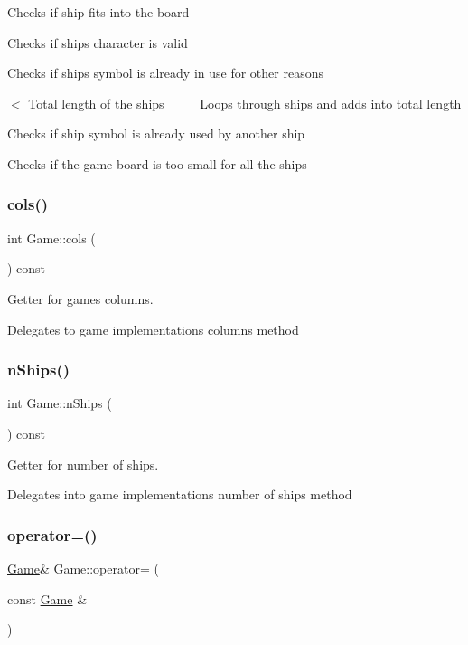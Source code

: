 Checks if ship fits into the board

Checks if ship\textquotesingle{}s character is valid

Checks if ship\textquotesingle{}s symbol is already in use for other reasons

$<$ Total length of the ships ~\newline
~\newline
~\newline
 Loops through ships and adds into total length

Checks if ship symbol is already used by another ship

Checks if the game board is too small for all the ships \mbox{\label{class_game_afbb769ac9dc75bd26e33a74a3cce5009}} 
\subsubsection{\texorpdfstring{cols()}{cols()}}
{\footnotesize\ttfamily int Game\+::cols (\begin{DoxyParamCaption}{ }\end{DoxyParamCaption}) const}



Getter for game\textquotesingle{}s columns. 

Delegates to game implementations columns method \mbox{\label{class_game_a783885809649e4799b199ece36c72be0}} 
\subsubsection{\texorpdfstring{n\+Ships()}{nShips()}}
{\footnotesize\ttfamily int Game\+::n\+Ships (\begin{DoxyParamCaption}{ }\end{DoxyParamCaption}) const}



Getter for number of ships. 

Delegates into game implementations number of ships method \mbox{\label{class_game_a4d0c0503733cc50b0b5cb8d7ef1237ec}} 
\subsubsection{\texorpdfstring{operator=()}{operator=()}}
{\footnotesize\ttfamily \mbox{\hyperlink{class_game}{Game}}\& Game\+::operator= (\begin{DoxyParamCaption}\item[{const \mbox{\hyperlink{class_game}{Game}} \&}]{ }\end{DoxyParamCaption})\hspace{0.3cm}{\ttfamily [delete]}}

